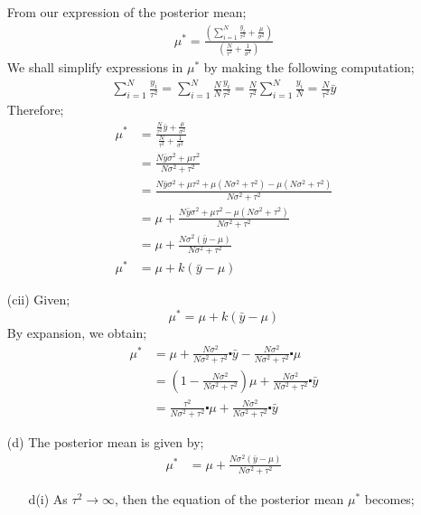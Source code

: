 \documentclass[12pt,a4paper]{article}
\begin{document}
\begin{itemize}
From our expression of the posterior mean;
\begin{align*}
\mu^{*}=\frac{\left(\sum_{i=1}^{N}\frac{y_{i}}{\tau^{2}}+\frac{\mu}{\sigma^{2}}\right)}{\left(\frac{N}{\tau^{2}}+\frac{1}{\sigma^{2}}\right)}
\end{align*}
We shall simplify expressions in $\mu^{*}$ by making the following computation;
\begin{align*}
\sum_{i=1}^{N}\frac{y_{i}}{\tau^{2}}=\sum_{i=1}^{N}\frac{N}{N}\frac{y_{i}}{\tau^{2}}=\frac{N}{\tau^{2}}\sum_{i=1}^{N}\frac{y_{i}}{N}=\frac{N}{\tau^{2}}\bar{y}
\end{align*}
Therefore;
\begin{align*}
\mu^{*}&=\frac{\frac{N}{\tau^{2}}\bar{y}+\frac{\mu}{\sigma^{2}} }{\frac{N}{\tau^{2}}+\frac{1}{\sigma^{2}}}\\
&=\frac{N\bar{y}\sigma^{2}+ \mu\tau^{2}}{N\sigma^{2}+ \tau^{2}}\\
&=\frac{N\bar{y}\sigma^{2}+ \mu\tau^{2}+\mu(N\sigma^{2}+\tau^{2})-\mu(N\sigma^{2}+\tau^{2})}{N\sigma^{2}+ \tau^{2}}\\
&=\mu + \frac{N\bar{y}\sigma^{2}+ \mu\tau^{2}-\mu(N\sigma^{2}+\tau^{2})}{N\sigma^{2}+ \tau^{2}}\\
&=\mu +\frac{N\sigma^{2}(\bar{y}-\mu)}{N\sigma^{2}+ \tau^{2}}\\
\mu^{*}&=\mu +k(\bar{y}-\mu)
\end{align*}
\item [(cii)]
Given; $$\mu^{*}=\mu +k(\bar{y}-\mu)$$
By expansion, we obtain;
\begin{align*}
\mu^{*}&=\mu + \frac{N\sigma^{2}}{N\sigma^{2}+ \tau^{2}}\centerdot \bar{y}- \frac{N\sigma^{2}}{N\sigma^{2}+ \tau^{2}}\centerdot \mu\\
&=\left(1-\frac{N\sigma^{2}}{N\sigma^{2}+ \tau^{2}}\right)\mu + \frac{N\sigma^{2}}{N\sigma^{2}+ \tau^{2}}\centerdot \bar{y}\\
&=\frac{\tau^{2} }{N\sigma^{2}+ \tau^{2}} \centerdot \mu+ \frac{N\sigma^{2}}{N\sigma^{2}+ \tau^{2}}\centerdot \bar{y}
\end{align*}
\item [(d)] The posterior mean is given by;
\begin{align}
\mu^{*}&=\mu +\frac{N\sigma^{2}(\bar{y}-\mu)}{N\sigma^{2}+ \tau^{2}} \label{9}
\end{align}
\begin{itemize}
	\item [d(i)] As $\tau^{2} \rightarrow \infty$, then the equation of the  posterior mean $\mu^{*}$ becomes;

\end{itemize}
\end{itemize}
\end{document}
